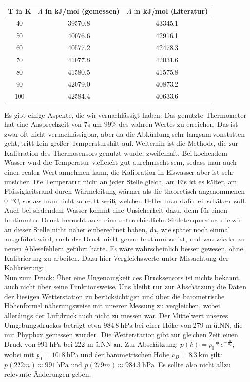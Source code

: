 \documentclass[]{article}
\begin{document}
	\begin{center}
		
		\begin{tabular}{|c|c|c|}
			\hline
			T in K & $\Lambda$ in kJ/mol (gemessen) &  $\Lambda$ in kJ/mol (Literatur)\\
			\hline
			\hline
			40 & 39570.8 & 43345.1\\
			\hline
			50 & 40076.6 & 42916.1\\
			\hline
			60 & 40577.2 & 42478.3\\
			\hline
			70 & 41077.8 & 42031.6\\
			\hline
			80 & 41580.5 & 41575.8\\
			\hline
			90 & 42079.0 & 40873.2\\
			\hline
			100 & 42584.4 & 40633.6\\
			\hline  			
		\end{tabular} 
	\end{center}
	Es gibt einige Aspekte, die wir vernachlässigt haben:
	Das genutzte Thermometer hat eine Ansprechzeit von 7s um $99\%$ des wahren Wertes zu erreichen. Das ist zwar oft nicht vernachlässigbar, aber da die Abkühlung sehr langsam vonstatten geht, tritt kein großer Temperaturshift auf.
	Weiterhin ist die Methode, die zur Kalibration des Thermosensors genutzt wurde, zweifelhaft. Bei kochendem Wasser wird die Temperatur vielleicht gut durchmischt sein, sodass man auch einen realen Wert annehmen kann, die Kalibration in Eiswasser aber ist sehr unsicher. Die Temperatur nicht an jeder Stelle gleich, am Eis ist es kälter, am Flüssigkeitsrand durch Wärmeleitung wärmer als die theoretisch angenommenen \SI{0}{\celsius}, sodass man nicht so recht weiß, welchen Fehler man dafür einschätzen soll. Auch bei siedendem Wasser kommt eine Unsicherheit dazu, denn für einen bestimmten Druck herrscht auch eine unterschiedliche Siedetemperatur, die wir an dieser Stelle nicht näher einberechnet haben, da, wie später noch einmal ausgeführt wird, auch der Druck nicht genau bestimmbar ist, und was wieder zu neuen Ablesefehlern geführt hätte.
	Es wäre wahrscheinlich besser gewesen, ohne Kalibrierung zu arbeiten. {\color{red}Dazu hier Vergleichswerte unter Missachtung der Kalibrierung}:\\
	Nun zum Druck: Über eine Ungenauigkeit des Drucksensors ist nichts bekannt, auch nicht über seine Funktionsweise. Uns bleibt nur zur Abschätzung die Daten der hiesigen Wetterstation zu berücksichtigen und über die barometrische Höhenformel näherungsweise mit unserer Messung zu vergleichen, wobei allerdings der Luftdruck auch nicht zu messen war. Der Mittelwert unseres Umgebungsdruckes beträgt etwa $\SI{984.8}{\hecto \pascal}$ bei einer Höhe von 279 m ü.NN, die mit Phyphox gemessen wurden. Die Wetterstation gibt zur gleichen Zeit einen Druck von $\SI{991}{\hecto \pascal}$ bei 222 m ü.NN an. Zur Abschätzung: $p(h)=p_0*e^{-\frac{h}{h_B}}$, wobei mit $p_0=\SI{1018}{\hecto \pascal}$ und der barometrischen Höhe $h_B=\SI{8.3}{\kilo \meter}$ gilt: $p(222m) \approx \SI{991}{\hecto \pascal}$ und $p(279m) \approx \SI{984.3}{\hecto \pascal}$. Es sollte also nicht allzu relevante Änderungen geben.\\
\end{document}

